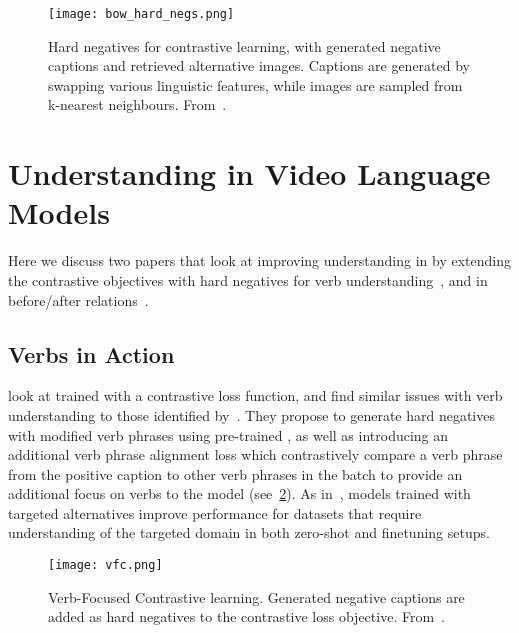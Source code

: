 \begin{figure}[t]
	\centering
	\texttt{[image: bow\_hard\_negs.png]}
	\caption{Hard negatives for contrastive learning, with generated negative
	captions and retrieved alternative images. Captions are generated by
	swapping various linguistic features, while images are sampled from 
	k-nearest neighbours. From~\citet{yuksekgonul2023when}.}
	\label{fig:bow_hard_negs}
\end{figure}


\section{Understanding in Video Language Models}
\label{sec:understandvidlm}

Here we discuss two papers that look at improving understanding in
 by extending the contrastive objectives with hard negatives
for verb understanding~\cite{momeni2023verbs}, and in before/after
relations~\cite{bagad2023testoftime}. 

\subsection{Verbs in Action}
\label{ssec:verbs}
\citet{momeni2023verbs} look at  trained with a contrastive
loss function, and find similar issues with verb understanding to those
identified by~\cite{yuksekgonul2023when}. They propose to generate hard
negatives with modified verb phrases using pre-trained , as well
as introducing an additional verb phrase alignment loss which contrastively
compare a verb phrase from the positive caption to other verb phrases in the
batch to provide an additional focus on verbs to the model
(see~\cref{fig:vfc}). As in~\cite{yuksekgonul2023when}, models trained with
targeted alternatives improve performance for datasets that require
understanding of the targeted domain in both zero-shot and finetuning setups. 

\begin{figure}[t]
	\centering
	\texttt{[image: vfc.png]}
	\caption{Verb-Focused Contrastive learning. Generated negative captions are
	added as hard negatives to the contrastive loss objective.
	From~\cite{momeni2023verbs}.}
	\label{fig:vfc}
\end{figure}



